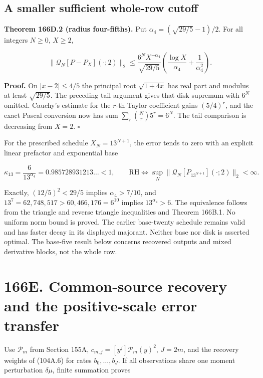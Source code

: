 \documentclass[
  11pt,
]{book}
\begin{document}
\subsection{A smaller sufficient whole-row
cutoff}\label{a-smaller-sufficient-whole-row-cutoff}

\textbf{Theorem 166D.2 (radius four-fifths).} Put
\(\alpha_4=(\sqrt{29/5}-1)/2\). For all integers \(N\ge0\), \(X\ge2\),

\[
\boxed{\|\mathcal Q_N[P-P_X](\cdot;2)\|_2
\le\frac{6^NX^{-\alpha_4}}{\sqrt{29/5}}
 \left(\frac{\log X}{\alpha_4}+\frac1{\alpha_4^2}\right).}
\tag{166D.3}
\]

\textbf{Proof.} On \(|x-2|\le4/5\) the principal root \(\sqrt{1+4x}\)
has real part and modulus at least \(\sqrt{29/5}\). The preceding tail
argument gives that disk supremum with \(6^N\) omitted. Cauchy's
estimate for the \(r\)-th Taylor coefficient gains \((5/4)^r\), and the
exact Pascal conversion now has sum \(\sum_r\binom Nr5^r=6^N\). The tail
comparison is decreasing from \(X=2\). \(\square\)

For the prescribed schedule \(X_N=13^{N+1}\), the error tends to zero
with an explicit linear prefactor and exponential base

\[
\kappa_{13}=\frac6{13^{\alpha_4}}=0.985728931213\ldots<1,\qquad
\boxed{\mathrm{RH}\iff
 \sup_N\|\mathcal Q_N[P_{13^{N+1}}](\cdot;2)\|_2<\infty.}
\tag{166D.4}
\]

Exactly, \((12/5)^2<29/5\) implies \(\alpha_4>7/10\), and
\(13^7=62{,}748{,}517>60{,}466{,}176=6^{10}\) implies
\(13^{\alpha_4}>6\). The equivalence follows from the triangle and
reverse triangle inequalities and Theorem 166B.1. No uniform norm bound
is proved. The earlier base-twenty schedule remains valid and has faster
decay in its displayed majorant. Neither base nor disk is asserted
optimal. The base-five result below concerns recovered outputs and mixed
derivative blocks, not the whole row.

\section{166E. Common-source recovery and the positive-scale error
transfer}\label{e.-common-source-recovery-and-the-positive-scale-error-transfer}

Use \(\mathcal P_m\) from Section 155A,
\(c_{m,j}=[y^j]\mathcal P_m(y)^2\), \(J=2m\), and the recovery weights
of (104A.6) for rates \(b_0,\ldots,b_J\). If all observations share one
moment perturbation \(\delta\mu\), finite summation proves
\end{document}
